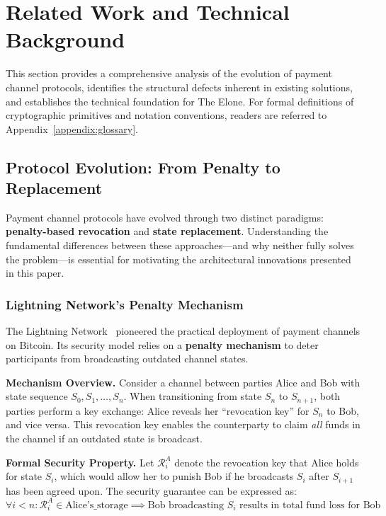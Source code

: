 \section{Related Work and Technical Background}

This section provides a comprehensive analysis of the evolution of payment channel protocols, identifies the structural defects inherent in existing solutions, and establishes the technical foundation for The Elone. For formal definitions of cryptographic primitives and notation conventions, readers are referred to Appendix~\ref{appendix:glossary}.

\subsection{Protocol Evolution: From Penalty to Replacement}

Payment channel protocols have evolved through two distinct paradigms: \textbf{penalty-based revocation} and \textbf{state replacement}. Understanding the fundamental differences between these approaches---and why neither fully solves the problem---is essential for motivating the architectural innovations presented in this paper.

\subsubsection{Lightning Network's Penalty Mechanism}

The Lightning Network~\cite{poon2016lightning} pioneered the practical deployment of payment channels on Bitcoin. Its security model relies on a \textbf{penalty mechanism} to deter participants from broadcasting outdated channel states.

\textbf{Mechanism Overview.} Consider a channel between parties Alice and Bob with state sequence $S_0, S_1, \ldots, S_n$. When transitioning from state $S_n$ to $S_{n+1}$, both parties perform a key exchange: Alice reveals her ``revocation key'' for $S_n$ to Bob, and vice versa. This revocation key enables the counterparty to claim \textit{all} funds in the channel if an outdated state is broadcast.

\textbf{Formal Security Property.} Let $\mathcal{R}_i^A$ denote the revocation key that Alice holds for state $S_i$, which would allow her to punish Bob if he broadcasts $S_i$ after $S_{i+1}$ has been agreed upon. The security guarantee can be expressed as:
$$\forall i < n: \mathcal{R}_i^A \in \text{Alice's\_storage} \implies \text{Bob broadcasting } S_i \text{ results in total fund loss for Bob}$$

